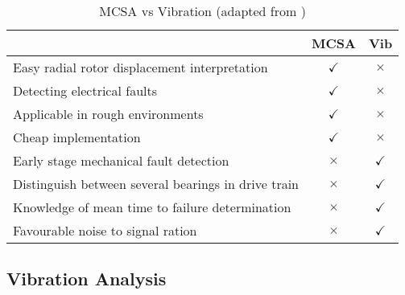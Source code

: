 \begin{table}
	\begin{center}
		\begin{tabular}{lcc}%
			\toprule
			  & \textbf{MCSA} & \textbf{Vib} \\
			\midrule
			Easy radial rotor displacement interpretation & $\checkmark$ & $\times$ \\
			Detecting electrical faults & $\checkmark$ & $\times$ \\
			Applicable in rough environments & $\checkmark$ & $\times$ \\
			Cheap implementation & $\checkmark$ & $\times$ \\
			Early stage mechanical fault detection & $\times$ & $\checkmark$ \\
			Distinguish between several bearings in drive train & $\times$ & $\checkmark$ \\
			Knowledge of mean time to failure determination & $\times$ & $\checkmark$ \\
			Favourable noise to signal ration & $\times$ & $\checkmark$ \\
			\bottomrule
		\end{tabular}
		\caption{MCSA vs Vibration (adapted from \cite{CM_mcsa_vib})}
		\label{tab:mcsa_vib}%
	\end{center}
\end{table}

\subsection{Vibration Analysis}\label{sec:CM_vib}

